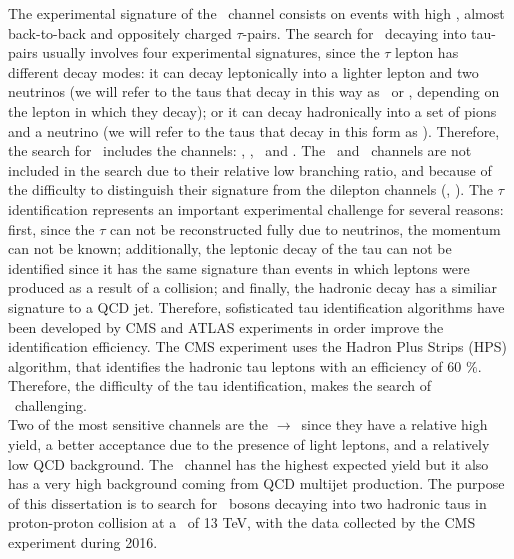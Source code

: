 \noindent The experimental signature of the \Zprimetotautau~channel consists on events with high \pt, almost
back-to-back and oppositely charged $\tau$-pairs. The search for \Zprime~decaying into tau-pairs 
usually involves four experimental signatures, since the $\tau$ lepton has different decay modes: it 
can decay leptonically into a lighter lepton and two neutrinos (we will refer to the taus that decay in 
this way as \taue~or \taumu, depending on the lepton in which they decay); 
or it can decay hadronically into a set of pions and a neutrino (we will refer to the taus that decay in this form
as \tauh). Therefore, the search for \Zprimetotautau~includes 
the channels: \taue\tauh, \taumu\tauh, \taue\taumu~and \tauh\tauh. The \taue\taue~and \taumu\taumu~channels
are not included in the search due to their relative low branching ratio, and because of the difficulty to
distinguish their signature from the dilepton channels (\Zprimetomumu, \Zprimetoee). The $\tau$ 
identification represents an important experimental challenge for several reasons: first, since 
the $\tau$ can not be reconstructed fully due to neutrinos, the momentum can not be known; additionally, the leptonic decay of 
the tau can not be identified since it has the same signature than events in which leptons were produced as a result of 
a collision; and finally, the hadronic decay has a similiar signature to a QCD jet. Therefore, sofisticated tau 
identification algorithms have been developed by CMS and ATLAS experiments in order improve the identification 
efficiency. The CMS experiment uses the Hadron Plus Strips (HPS) algorithm, that 
identifies the hadronic tau leptons with an efficiency of 60 $\%$. Therefore, the difficulty of the tau 
identification, makes the search of \Zprimetotautau~challenging. \\

\noindent Two of the most sensitive channels are the \Zprime$\rightarrow$\tauell\tauh~since they have 
a relative high yield, a better acceptance due to the presence of light leptons, and a relatively
low QCD background. The \Zprimetotauh~channel has the highest 
expected yield but it also has a very high background coming 
from QCD multijet production. The purpose of this dissertation is to search for \Zprime~bosons decaying into two hadronic taus 
in proton-proton collision at a \centermassenergy~of 13 TeV, with the data collected by the 
CMS  experiment during 2016. \\


